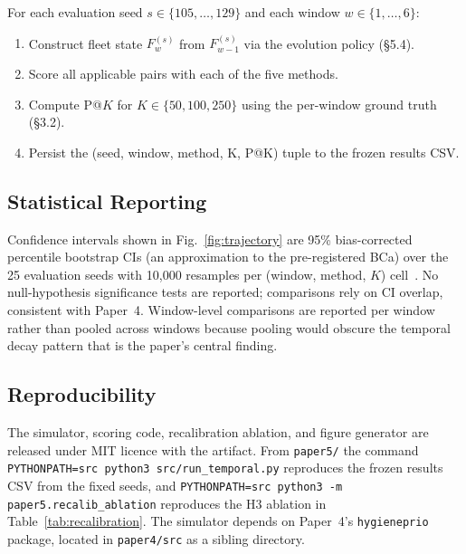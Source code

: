 For each evaluation seed $s \in \{105, \ldots, 129\}$ and each window $w \in \{1, \ldots, 6\}$:
\begin{enumerate}
\item Construct fleet state $F_w^{(s)}$ from $F_{w-1}^{(s)}$ via the evolution policy (\S5.4).
\item Score all applicable pairs with each of the five methods.
\item Compute P@$K$ for $K \in \{50, 100, 250\}$ using the per-window ground truth (\S3.2).
\item Persist the (seed, window, method, K, P@K) tuple to the frozen results CSV.
\end{enumerate}

\subsection{Statistical Reporting}

Confidence intervals shown in Fig.~\ref{fig:trajectory} are 95\% bias-corrected percentile bootstrap CIs (an approximation to the pre-registered BCa) over the 25 evaluation seeds with 10{,}000 resamples per (window, method, $K$) cell~\cite{efron1994introduction}. No null-hypothesis significance tests are reported; comparisons rely on CI overlap, consistent with Paper~4. Window-level comparisons are reported per window rather than pooled across windows because pooling would obscure the temporal decay pattern that is the paper's central finding.

\subsection{Reproducibility}

The simulator, scoring code, recalibration ablation, and figure generator are released under MIT licence with the artifact. From \texttt{paper5/} the command \texttt{PYTHONPATH=src python3 src/run\_temporal.py} reproduces the frozen results CSV from the fixed seeds, and \texttt{PYTHONPATH=src python3 -m paper5.recalib\_ablation} reproduces the H3 ablation in Table~\ref{tab:recalibration}. The simulator depends on Paper~4's \texttt{hygieneprio} package, located in \texttt{paper4/src} as a sibling directory.
